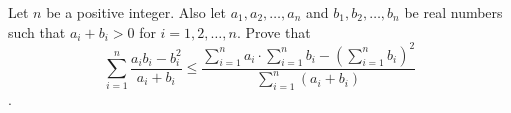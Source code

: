 Let \(n\) be a positive integer. Also let \(a_1, a_2, \dots, a_n\) and \(b_1,b_2,\dots, b_n\) be real numbers such that \(a_i+b_i>0\) for \(i=1,2,\dots, n\). Prove that
\[\sum_{i=1}^n \frac{a_ib_i-b_i^2}{a_i+b_i}\le\frac{\displaystyle \sum_{i=1}^n a_i\cdot \sum_{i=1}^n b_i - \left( \sum_{i=1}^n b_i\right) ^2}{\displaystyle\sum_{i=1}^n (a_i+b_i)}\].